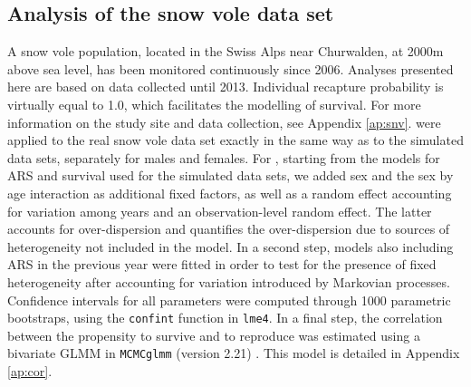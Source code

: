 \subsection{Analysis of the snow vole data set}

A snow vole population, located in the Swiss Alps near Churwalden, at 2000m above sea level, has been monitored continuously since 2006. Analyses presented here are based on data collected until 2013. Individual recapture probability is virtually equal to 1.0, which facilitates the modelling of survival. For more information on the study site and data collection, see Appendix \ref{ap:snv}. \NSM were applied to the real snow vole data set exactly in the same way as to the simulated data sets, separately for males and females.
For \MM, starting from the models for ARS and survival used for the simulated data sets, we added sex and the sex by age interaction as additional fixed factors, as well as a random effect accounting for variation among years and an observation-level random effect. The latter accounts for over-dispersion \parencite[see e.g.][]{Atkins2013} and quantifies the over-dispersion due to sources of heterogeneity not included in the model.
In a second step, models also including ARS in the previous year were fitted in order to test for the presence of fixed heterogeneity after accounting for variation introduced by Markovian processes. Confidence intervals for all parameters were computed through 1000 parametric bootstraps, using the \verb+confint+ function in \verb+lme4+. In a final step, the correlation between the propensity to survive and to reproduce was estimated using a bivariate GLMM in \verb+MCMCglmm+ (version 2.21) \parencite{Hadfield2010a}. This model is detailed in Appendix \ref{ap:cor}.

